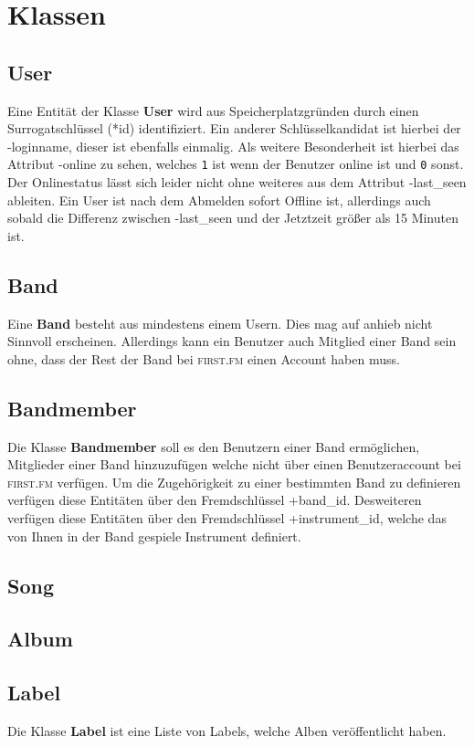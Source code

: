 \documentclass[11pt,a4paper,DIV=9]{scrartcl}
\begin{document}
\section{Klassen}
  \subsection{User}
    Eine Entität der Klasse \textbf{User} wird aus Speicherplatzgründen durch einen Surrogatschlüssel (*id) identifiziert. Ein anderer Schlüsselkandidat ist hierbei der -loginname, dieser ist ebenfalls einmalig. Als weitere Besonderheit ist hierbei das Attribut -online zu sehen, welches \texttt{1} ist wenn der Benutzer online ist und \texttt{0} sonst. Der Onlinestatus lässt sich leider nicht ohne weiteres aus dem Attribut -last\_seen ableiten. Ein User ist nach dem Abmelden sofort Offline ist, allerdings auch sobald die Differenz zwischen -last\_seen und der Jetztzeit größer als 15 Minuten ist.
  \subsection{Band}
    Eine \textbf{Band} besteht aus mindestens einem Usern. Dies mag auf anhieb nicht Sinnvoll erscheinen. Allerdings kann ein Benutzer auch Mitglied einer Band sein ohne, dass der Rest der Band bei \textsc{first.fm} einen Account haben muss. 
  \subsection{Bandmember}
    Die Klasse \textbf{Bandmember} soll es den Benutzern einer Band ermöglichen, Mitglieder einer Band hinzuzufügen welche nicht über einen Benutzeraccount bei \textsc{first.fm} verfügen. Um die Zugehörigkeit zu einer bestimmten Band zu definieren verfügen diese Entitäten über den Fremdschlüssel +band\_id. Desweiteren verfügen diese Entitäten über den Fremdschlüssel +instrument\_id, welche das von Ihnen in der Band gespiele Instrument definiert.
  \subsection{Song}
  \subsection{Album}
  \subsection{Label}
    Die Klasse \textbf{Label} ist eine Liste von Labels, welche Alben veröffentlicht haben.
\end{document}

